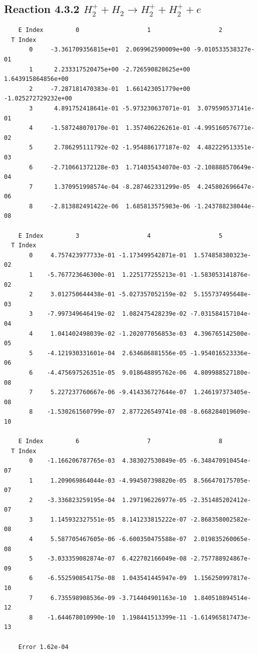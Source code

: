 \documentclass[12pt,dvipdfmx]{article}
\begin{document}
\newpage
\subsection{
Reaction 4.3.2 $   H_2^+ + H_2 \rightarrow H_2^+ + H_2^+ + e$}


\begin{small}\begin{verbatim}
    E Index         0                   1                   2
  T Index
       0     -3.361709356815e+01  2.069962590009e+00 -9.010533538327e-01
       1      2.233317520475e+00 -2.726590828625e+00  1.643915864856e+00
       2     -7.287181470383e-01  1.661423051779e+00 -1.025272729232e+00
       3      4.891752418641e-01 -5.973230637071e-01  3.079590537141e-01
       4     -1.587248070170e-01  1.357406226261e-01 -4.995160576771e-02
       5      2.786295111792e-02 -1.954886177187e-02  4.482229513351e-03
       6     -2.710661372128e-03  1.714035434070e-03 -2.108888570649e-04
       7      1.370951998574e-04 -8.287462331299e-05  4.245802696647e-06
       8     -2.813882491422e-06  1.685813575983e-06 -1.243788238044e-08

    E Index         3                   4                   5
  T Index
       0     4.757423977733e-01 -1.173499542871e-01  1.574858380323e-02
       1    -5.767723646300e-01  1.225177255213e-01 -1.583053141876e-02
       2     3.012750644438e-01 -5.027357052159e-02  5.155737495648e-03
       3    -7.997349646419e-02  1.082475428239e-02 -7.031584157104e-04
       4     1.041402498039e-02 -1.202077056853e-03  4.396765142500e-05
       5    -4.121930331601e-04  2.634686881556e-05 -1.954016523336e-06
       6    -4.475697526351e-05  9.018648895762e-06  4.809988527180e-08
       7     5.227237760667e-06 -9.414336727644e-07  1.246197373405e-08
       8    -1.530261560799e-07  2.877226549741e-08 -8.668284019609e-10

    E Index         6                   7                   8
  T Index
       0    -1.166206787765e-03  4.383027530849e-05 -6.348470910454e-07
       1     1.209069864044e-03 -4.994507398820e-05  8.566470175705e-07
       2    -3.336823259195e-04  1.297196226977e-05 -2.351485202412e-07
       3     1.145932327551e-05  8.141233815222e-07 -2.868358002582e-08
       4     5.587705467605e-06 -6.600350475588e-07  2.019835260065e-08
       5    -3.033359082874e-07  6.422702166049e-08 -2.757788924867e-09
       6    -6.552590854175e-08  1.043541445947e-09  1.156250997817e-10
       7     6.735598908536e-09 -3.714404901163e-10  1.840510894514e-12
       8    -1.644678010990e-10  1.198441513399e-11 -1.614965817473e-13

    Error 1.62e-04
\end{verbatim}\end{small}
\end{document}

